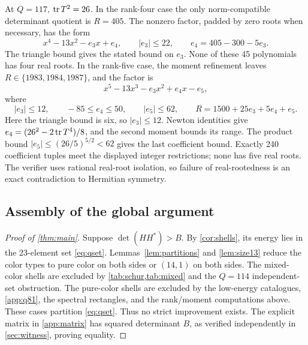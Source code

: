 At $Q=117$, $\operatorname{tr} T^2=26$. In the rank-four case the only norm-compatible determinant quotient is $R=405$. The nonzero factor, padded by zero roots when necessary, has the form
\[
 x^4-13x^2-e_3x+e_4,\qquad
 |e_3|\le22,\qquad e_4=405-300-5e_3.
\]
The triangle bound gives the stated bound on $e_3$. None of these 45 polynomials has four real roots. In the rank-five case, the moment refinement leaves $R\in\{1983,1984,1987\}$, and the factor is
\[
 x^5-13x^3-e_3x^2+e_4x-e_5,
\]
where
\[
 |e_3|\le12,\qquad -85\le e_4\le50,\qquad |e_5|\le62,
 \qquad R=1500+25e_3+5e_4+e_5.
\]
Here the triangle bound is six, so $|e_3|\le12$. Newton identities give $e_4=(26^2-2\operatorname{tr} T^4)/8$, and the second moment bounds its range. The product bound $|e_5|\le(26/5)^{5/2}<62$ gives the last coefficient bound. Exactly 240 coefficient tuples meet the displayed integer restrictions; none has five real roots. The verifier uses rational real-root isolation, so failure of real-rootedness is an exact contradiction to Hermitian symmetry.

\subsection{Assembly of the global argument}
\begin{proof}[Proof of \cref{thm:main}]
Suppose $\det(HH^*)>B$. By \cref{cor:shells}, its energy lies in the 23-element set \eqref{eq:qset}. Lemmas~\ref{lem:partitions} and \ref{lem:size13} reduce the color types to pure color on both sides or $(14,1)$ on both sides. The mixed-color shells are excluded by \cref{tab:schur,tab:mixed} and the $Q=114$ independent-set obstruction. The pure-color shells are excluded by the low-energy catalogues, \cref{app:q81}, the spectral rectangles, and the rank/moment computations above. These cases partition \eqref{eq:qset}. Thus no strict improvement exists. The explicit matrix in \cref{app:matrix} has squared determinant $B$, as verified independently in \cref{sec:witness}, proving equality.
\end{proof}
